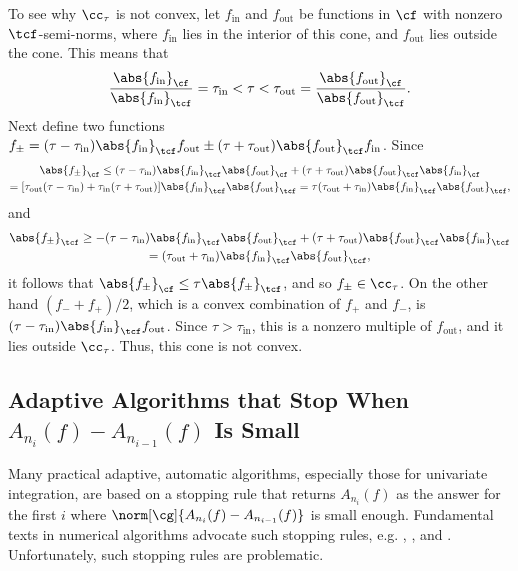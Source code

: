 \documentclass[]{elsarticle}
\theoremstyle{definition}
\theoremstyle{remark}
\newcommand{\Fnorm}[1]{\abs{#1}_{\cf}}
\newcommand{\Ftnorm}[1]{\abs{#1}_{\tcf}}
\begin{document}
To see why $\cc_{\tau}$ is not convex, let $f_{\text{in}}$ and $f_{\text{out}}$ be functions in $\cf$ with nonzero $\tcf$-semi-norms, where $f_{\text{in}}$  lies in the interior of this cone, and $f_{\text{out}}$ lies outside the cone.  This means that 
\[
\frac{\Fnorm{f_{\text{in}}}} {\Ftnorm{f_{\text{in}}}} = \tau_{\text{in}} < \tau < \tau_{\text{out}} =  \frac{\Fnorm{f_{\text{out}}}} {\Ftnorm{f_{\text{out}}}}.
\]
Next define two functions $f_{\pm} = (\tau-\tau_{\text{in}}) \Ftnorm{f_{\text{in}}} f_{\text{out}}  \pm (\tau + \tau_{\text{out}}) \Ftnorm{f_{\text{out}}} f_{\text{in}}$.
Since 
\begin{multline*} 
\Fnorm{f_{\pm}} \le (\tau-\tau_{\text{in}}) \Ftnorm{f_{\text{in}}} \Fnorm{f_{\text{out}}}  + (\tau + \tau_{\text{out}}) \Ftnorm{f_{\text{out}}} \Fnorm{f_{\text{in}}}\\
= [\tau_{\text{out}} (\tau-\tau_{\text{in}})  + \tau_{\text{in}} (\tau + \tau_{\text{out}})] \Ftnorm{f_{\text{in}}} \Ftnorm{f_{\text{out}}} =  \tau (\tau_{\text{out}} +\tau_{\text{in}}) \Ftnorm{f_{\text{in}}} \Ftnorm{f_{\text{out}}},
\end{multline*}
and 
\begin{multline*} 
\Ftnorm{f_{\pm}} \ge -(\tau-\tau_{\text{in}}) \Ftnorm{f_{\text{in}}} \Ftnorm{f_{\text{out}}}  + (\tau + \tau_{\text{out}}) \Ftnorm{f_{\text{out}}} \Ftnorm{f_{\text{in}}}\\
 =  (\tau_{\text{out}} +\tau_{\text{in}}) \Ftnorm{f_{\text{in}}} \Ftnorm{f_{\text{out}}},
\end{multline*}
it follows that $\Fnorm{f_{\pm}} \le \tau \Ftnorm{f_{\pm}}$, and so $f_{\pm} \in \cc_{\tau}$.  On the other hand $(f_- + f_+)/2$, which is a convex combination of $f_{+}$ and $f_-$, is $(\tau-\tau_{\text{in}}) \Ftnorm{f_{\text{in}}} f_{\text{out}}$.  Since $\tau > \tau_{\text{in}}$, this is a nonzero multiple of $f_{\text{out}}$, and it lies outside $\cc_{\tau}$.  Thus, this cone is not convex.

\subsection{Adaptive Algorithms that Stop When $A_{n_{i}}(f)-A_{n_{i-1}}(f)$ Is Small} \label{Lynesssubsec}

Many practical adaptive, automatic algorithms, especially those for univariate integration, are based on a stopping rule that returns $A_{n_{i}}(f)$ as the answer for the first $i$ where $\norm[\cg]{A_{n_{i}}(f)-A_{n_{i-1}}(f)}$ is small enough.  Fundamental texts in numerical algorithms advocate such stopping rules, e.g. \cite[p.\ 223--224]{BurFai10}, \cite[p.\ 233]{CheKin12a}, and \cite[p.\ 270]{Sau12a}.  Unfortunately, such stopping rules are problematic.
\end{document}
